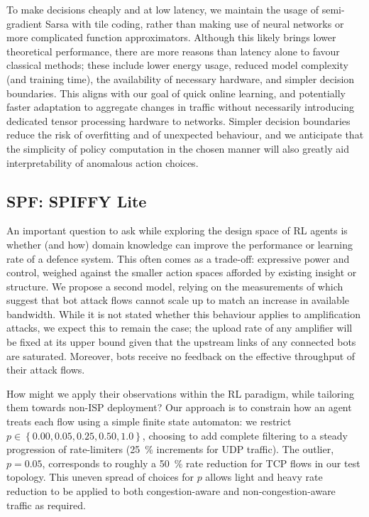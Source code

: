 \documentclass[conference, letterpaper, 10pt, times]{IEEEtran}
\begin{document}
To make decisions cheaply and at low latency, we maintain the usage of semi-gradient Sarsa with tile coding, rather than making use of neural networks or more complicated function approximators.
Although this likely brings lower theoretical performance, there are more reasons than latency alone to favour classical methods; these include lower energy usage, reduced model complexity (and training time), the availability of necessary hardware, and simpler decision boundaries.
This aligns with our goal of quick online learning, and potentially faster adaptation to aggregate changes in traffic without necessarily introducing dedicated tensor processing hardware to networks.
Simpler decision boundaries reduce the risk of overfitting and of unexpected behaviour, and we anticipate that the simplicity of policy computation in the chosen manner will also greatly aid interpretability of anomalous action choices.


\subsection{SPF: SPIFFY Lite}

An important question to ask while exploring the design space of RL agents is whether (and how) domain knowledge can improve the performance or learning rate of a defence system.
This often comes as a trade-off: expressive power and control, weighed against the smaller action spaces afforded by existing insight or structure.
We propose a second model, relying on the measurements of \textcite{DBLP:conf/ndss/KangGS16} which suggest that bot attack flows cannot scale up to match an increase in available bandwidth.
While it is not stated whether this behaviour applies to amplification attacks, we expect this to remain the case; the upload rate of any amplifier will be fixed at its upper bound given that the upstream links of any connected bots are saturated.
Moreover, bots receive no feedback on the effective throughput of their attack flows.

How might we apply their observations within the RL paradigm, while tailoring them towards non-ISP deployment?
Our approach is to constrain how an agent treats each flow using a simple finite state automaton: we restrict $p \in \left\{ 0.00, 0.05, 0.25, 0.50, 1.0 \right\}$, choosing to add complete filtering to a steady progression of rate-limiters (\SI{25}{\percent} increments for UDP traffic).
The outlier, $p=0.05$, corresponds to roughly a \SI{50}{\percent} rate reduction for TCP flows in our test topology.
This uneven spread of choices for $p$ allows light and heavy rate reduction to be applied to both congestion-aware and non-congestion-aware traffic as required.
\end{document}

